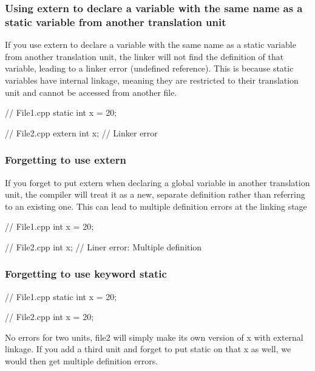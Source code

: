 \documentclass{report}
\begin{document}
    \bigbreak \noindent 
    \subsubsection{Using extern to declare a variable with the same name as a static variable from another translation unit}
    \bigbreak \noindent 
    If you use extern to declare a variable with the same name as a static variable from another translation unit, the linker will not find the definition of that variable, leading to a linker error (undefined reference). This is because static variables have internal linkage, meaning they are restricted to their translation unit and cannot be accessed from another file.
    \bigbreak \noindent 
    \begin{cppcode}
    // File1.cpp
    static int x = 20;

    // File2.cpp
    extern int x; // Linker error
    \end{cppcode}
    
    \bigbreak \noindent 
    \subsubsection{Forgetting to use extern}
    \bigbreak \noindent 
    If you forget to put extern when declaring a global variable in another translation unit, the compiler will treat it as a new, separate definition rather than referring to an existing one. This can lead to multiple definition errors at the linking stage
    \bigbreak \noindent 
    \begin{cppcode}
    //  File1.cpp
    int x = 20;

    // File2.cpp
    int x; // Liner error: Multiple definition
    \end{cppcode}

    \bigbreak \noindent 
    \subsubsection{Forgetting to use keyword static}
    \bigbreak \noindent 
    \begin{cppcode}
        //  File1.cpp
        static int x = 20;

        // File2.cpp
        int x = 20; 
    \end{cppcode}
    \bigbreak \noindent 
    No errors for two units, file2 will simply make its own version of x with external linkage. If you add a third unit and forget to put static on that x as well, we would then get multiple definition errors.
\end{document}
